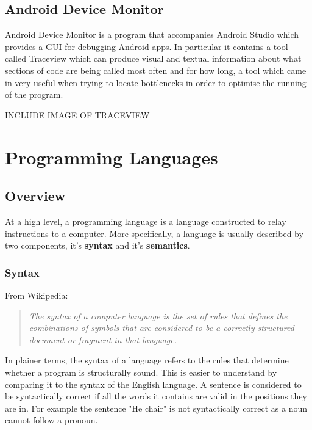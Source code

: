 \documentclass[ %
                    author={Jonathan Rankin},
                supervisor={Dr. David May, Dr. Ian Holyer},
                    degree={MEng},
                     title={CodeTouch},
                  subtitle={A Revolutionary Way To Program Real Code On Touch Screen Devices},
                      type={enterprise},
                      year={2015 } ]{dissertation}
\begin{document}
\subsection{Android Device Monitor}
Android Device Monitor is a program that accompanies Android Studio which provides a GUI for debugging Android apps. In particular it contains a tool called Traceview which can produce visual and textual information about what sections of code are being called most often and for how long, a tool which came in very useful when trying to locate bottlenecks in order to optimise the running of the program.

INCLUDE IMAGE OF TRACEVIEW

\section{Programming Languages}


\subsection{Overview}
At a high level, a programming language is a language constructed to relay instructions to a computer. More specifically, a language is usually described by two components, it's \textbf{syntax} and it's \textbf{semantics}.

\subsubsection{Syntax}
From Wikipedia:

\begin{quote}

\textit{The syntax of a computer language is the set of rules that defines the combinations of symbols that are considered to be a correctly structured document or fragment in that language.}
\end{quote}

In plainer terms, the syntax of a language refers to the rules that determine whether a program is structurally sound. This is easier to understand by comparing it to the syntax of the English language. A sentence is considered to be syntactically correct if all the words it contains are valid in the positions they are in. For example the sentence "He chair" is not syntactically correct as a noun cannot follow a pronoun.
\end{document}
